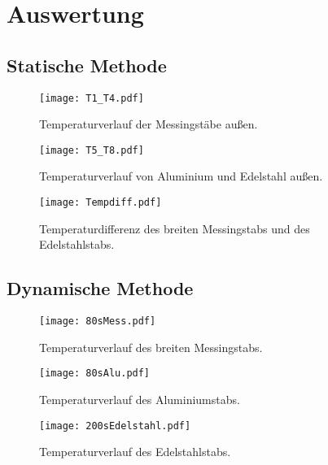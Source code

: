 \section{Auswertung}
\label{sec:Auswertung}

\subsection{Statische Methode}
\label{sec:stat}

\begin{figure}
  \centering
  \texttt{[image: T1\_T4.pdf]}
  \caption{Temperaturverlauf der Messingstäbe außen.}
  \label{fig:T1T4}
\end{figure}

\begin{figure}
  \centering
  \texttt{[image: T5\_T8.pdf]}
  \caption{Temperaturverlauf von Aluminium und Edelstahl außen.}
  \label{fig:T5T8}
\end{figure}

\begin{figure}
  \centering
  \texttt{[image: Tempdiff.pdf]}
  \caption{Temperaturdifferenz des breiten Messingstabs und des Edelstahlstabs.}
  \label{fig:Tempdiff}
\end{figure}

\subsection{Dynamische Methode}
\label{dynam}

\begin{figure}
  \centering
  \texttt{[image: 80sMess.pdf]}
  \caption{Temperaturverlauf des breiten Messingstabs.}
  \label{fig:80sMess}
\end{figure}

\begin{figure}
  \centering
  \texttt{[image: 80sAlu.pdf]}
  \caption{Temperaturverlauf des Aluminiumstabs.}
  \label{fig:80sAlu}
\end{figure}

\begin{figure}
  \centering
  \texttt{[image: 200sEdelstahl.pdf]}
  \caption{Temperaturverlauf des Edelstahlstabs.}
  \label{fig:200sEdelstahl}
\end{figure}

